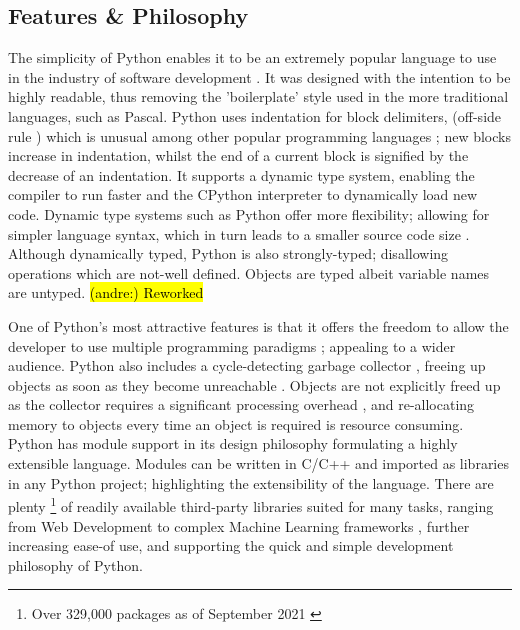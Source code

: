 \documentclass[12pt, a4paper]{report}
\DeclareRobustCommand{\andre}[1]{ {\begingroup\sethlcolor{BurntOrange}\hl{(andre:) #1}\endgroup} }
\theoremstyle{definition}
\theoremstyle{definition}%
\theoremstyle{definition}%
\theoremstyle{definition}%
\theoremstyle{definition}%
\theoremstyle{definition}%
\begin{document}
        \subsection{Features \& Philosophy}
        \par The simplicity of Python enables it to be an extremely popular language to use in the industry of software development \cite{tiobe2022index}. It was designed with the intention
        to be highly readable, thus removing the 'boilerplate' style used in the more traditional languages, such as Pascal. Python uses indentation for block delimiters,
        (off-side rule \cite[pp.4--5]{van2021python}) which is unusual among other popular programming languages \cite[pp.2--3]{van2021python}; new blocks increase in indentation, whilst the end of 
        a current block is signified by the decrease of an indentation. It supports a dynamic type system, enabling the compiler to run faster and the CPython interpreter to dynamically load new code. 
        Dynamic type systems such as Python offer more flexibility; allowing for simpler language syntax, which in turn leads to a smaller source code size \cite{dynamic2013typing}. Although dynamically typed,
        Python is also strongly-typed; disallowing operations which are not-well defined. Objects are typed albeit variable names are untyped.
        \andre{Reworked}
        \par One of Python's most attractive features is that it offers the freedom to allow the developer to use multiple programming paradigms \cite{van2007python}; appealing to a wider audience. Python
        also includes a cycle-detecting garbage collector \cite{van2007python}, freeing up objects as soon as they become unreachable \cite[pp.9--10]{van1994python}. Objects are not explicitly freed up
        as the collector requires a significant processing overhead \cite[pp.27-30]{zorn1990barrier}, and re-allocating memory to objects every time an object is required is resource consuming. Python has 
        module support in its design philosophy formulating a highly extensible language. Modules can be written in C/C++ \cite{srinath2017python} and imported as libraries in any Python project;
        highlighting the extensibility of the language. There are plenty \footnote{Over 329,000 packages as of September 2021 \cite{van2007python}} of readily available 
        third-party libraries suited for many tasks, ranging from Web Development \cite{forcier2008python} to complex Machine Learning frameworks \cite{pedregosa2011scikit}, further increasing 
        ease-of use, and supporting the quick and simple development philosophy of Python.
\end{document}
